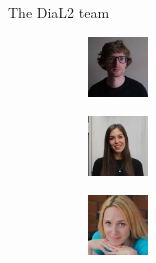 \documentclass[
  ignorenonframetext,
  t]{beamer}
\begin{document}
\begin{frame}{The DiaL2 team}
\begin{figure}
\begin{minipage}{0.25\linewidth}
\end{minipage}%
%
\begin{minipage}{0.25\linewidth}

\begin{figure}[H]

{\centering \includegraphics[width=0.63in,height=\textheight]{images/moroz.jpeg}

}


\end{figure}%

\end{minipage}%
\newline
\begin{minipage}{0.25\linewidth}

\begin{figure}[H]

{\centering \includegraphics[width=0.63in,height=\textheight]{images/naccarato.jpg}

}


\end{figure}%

\end{minipage}%
%
\begin{minipage}{0.25\linewidth}

\begin{figure}[H]

{\centering \includegraphics[width=0.63in,height=\textheight]{images/yakovleva.jpg}

}


\end{figure}%

\end{minipage}%
%
\begin{minipage}{0.25\linewidth}


\end{minipage}
\end{figure}
\end{frame}
\end{document}
